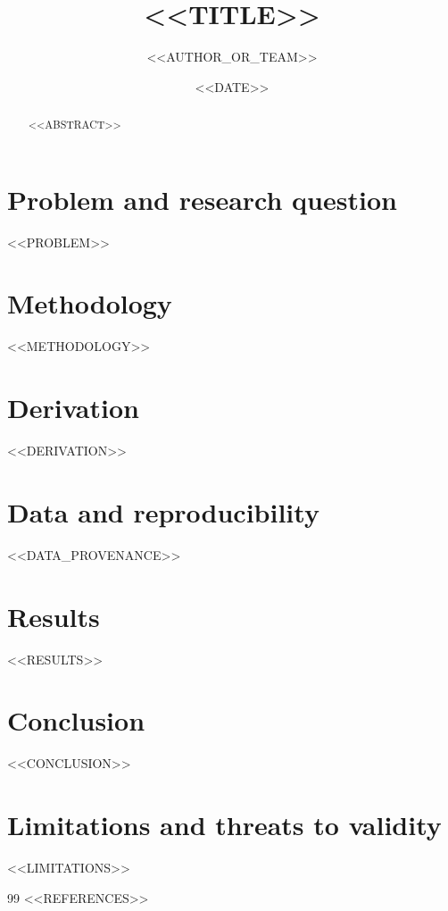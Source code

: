 \documentclass[11pt,a4paper]{article}
\title{<<TITLE>>}          %
\author{<<AUTHOR_OR_TEAM>>}
\date{<<DATE>>}
\begin{document}
\maketitle

\begin{abstract}
<<ABSTRACT>>               %
\end{abstract}

\section{Problem and research question}
<<PROBLEM>>                %

\section{Methodology}
<<METHODOLOGY>>            %

\section{Derivation}
<<DERIVATION>>            %

\section{Data and reproducibility}
<<DATA_PROVENANCE>>       %

\section{Results}
<<RESULTS>>               %

\section{Conclusion}
<<CONCLUSION>>            %

\section{Limitations and threats to validity}
<<LIMITATIONS>>

\begin{thebibliography}{99}
<<REFERENCES>>            %
\end{thebibliography}
\end{document}
